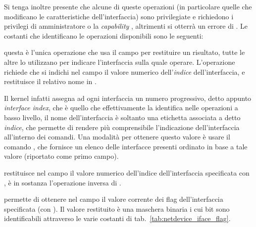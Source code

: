 Si tenga inoltre presente che alcune di queste operazioni (in particolare
quelle che modificano le caratteristiche dell'interfaccia) sono privilegiate e
richiedono i privilegi di amministratore o la \textit{capability}
, altrimenti si otterrà un errore di .
Le costanti che identificano le operazioni disponibili sono le seguenti:
\begin{basedescript}{\desclabelwidth{1.5cm}\desclabelstyle{\nextlinelabel}}
\item[\constd{SIOCGIFNAME}] questa è l'unica operazione che usa il campo
   per restituire un risultato, tutte le altre lo utilizzano
  per indicare l'interfaccia sulla quale operare. L'operazione richiede che si
  indichi nel campo  il valore numerico dell'\textsl{indice}
  dell'interfaccia, e restituisce il relativo nome in .

  Il kernel infatti assegna ad ogni interfaccia un numero progressivo, detto
  appunto  \textit{interface index}, che è quello che
  effettivamente la identifica nelle operazioni a basso livello, il nome
  dell'interfaccia è soltanto una etichetta associata a detto \textsl{indice},
  che permette di rendere più comprensibile l'indicazione dell'interfaccia
  all'interno dei comandi. Una modalità per ottenere questo valore è usare il
  comando , che fornisce un elenco delle interfacce presenti
  ordinato in base a tale valore (riportato come primo campo).
  

\item[\constd{SIOCGIFINDEX}] restituisce nel campo  il valore
  numerico dell'indice dell'interfaccia specificata con , è in
  sostanza l'operazione inversa di .

\item[\constd{SIOCGIFFLAGS}] permette di ottenere nel campo  il
  valore corrente dei flag dell'interfaccia specificata (con ).
  Il valore restituito è una maschera binaria i cui bit sono identificabili
  attraverso le varie costanti di tab.~\ref{tab:netdevice_iface_flag}.


\end{basedescript}
